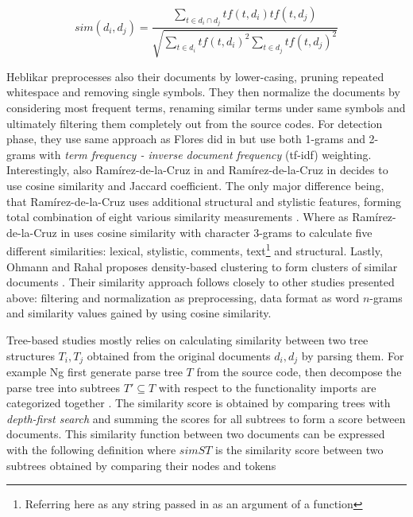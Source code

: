 \begin{equation}
    sim(d_i, d_j) = \dfrac{\sum\limits_{t \in d_i \cap d_j} tf(t, d_i) tf(t, d_j) }
                          {\sqrt{\sum\limits_{t \in d_i} tf(t, d_i)^2 \sum\limits_{t \in d_j} tf(t, d_j)^2}}
\end{equation}

\noindent
Heblikar \etal \cite{Heblikar2015NormalizationBS} preprocesses also their documents by lower-casing, pruning repeated whitespace and removing single symbols. They then normalize the documents by considering most frequent terms, renaming similar terms under same symbols and ultimately filtering them completely out from the source codes. For detection phase, they use same approach as Flores \etal did in \cite{USCR2014} but use both 1-grams and 2-grams with \emph{term frequency - inverse document frequency} (tf-idf) weighting. Interestingly, also Ramírez-de-la-Cruz \etal in \cite{OTIOLSS2015} and Ramírez-de-la-Cruz \etal in \cite{ramirez2015high} decides to use cosine similarity and Jaccard coefficient. The only major difference being, that Ramírez-de-la-Cruz \etal uses additional structural and stylistic features, forming total combination of eight various similarity measurements \cite{OTIOLSS2015}. Where as Ramírez-de-la-Cruz \etal in \cite{ramirez2015high} uses cosine similarity with character 3-grams to calculate five different similarities: lexical, stylistic, comments, text\footnote{Referring here as any string passed in as an argument of a function} and structural. Lastly, Ohmann and Rahal proposes density-based clustering to form clusters of similar documents \cite{Ohmann2015}. Their similarity approach follows closely to other studies presented above: filtering and normalization as preprocessing, data format as word $n$-grams and similarity values gained by using cosine similarity. 

Tree-based studies mostly relies on calculating similarity between two tree structures $T_i, T_j$ obtained from the original documents $d_i, d_j$ by parsing them. For example Ng \etal first generate parse tree $T$ from the source code, then decompose the parse tree into subtrees $T' \subseteq T$ with respect to the functionality \eg imports are categorized together \cite{TBCFPD2012}. The similarity score is obtained by comparing trees with \emph{depth-first search} and summing the scores for all subtrees to form a score between documents. This similarity function between two documents can be expressed with the following definition where $simST$ is the similarity score between two subtrees obtained by comparing their nodes and tokens

